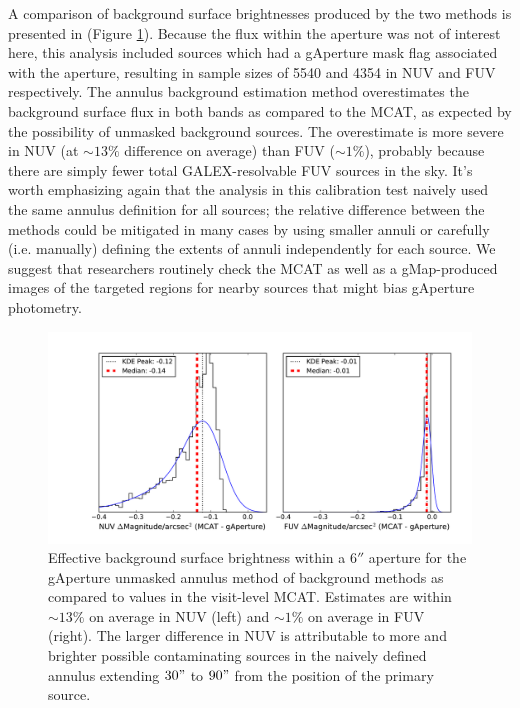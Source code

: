 \documentclass[preprint]{aastex}
\begin{document}
A comparison of background surface brightnesses produced by the two methods is presented in (Figure \ref{bgrelphot}). Because the flux within the aperture was not of interest here, this analysis included sources which had a gAperture mask flag associated with the aperture, resulting in sample sizes of 5540 and 4354 in NUV and FUV respectively. The annulus background estimation method overestimates the background surface flux in both bands as compared to the MCAT, as expected by the possibility of unmasked background sources. The overestimate is more severe in NUV (at $\sim 13\%$ difference on average) than FUV ($\sim 1\%$), probably because there are simply fewer total GALEX-resolvable FUV sources in the sky. It's worth emphasizing again that the analysis in this calibration test naively used the same annulus definition for all sources; the relative difference between the methods could be mitigated in many cases by using smaller annuli or carefully (i.e. manually) defining the extents of annuli independently for each source. We suggest that researchers routinely check the MCAT as well as a gMap-produced images of the targeted regions for nearby sources that might bias gAperture photometry.

\begin{figure}[h]
\includegraphics[scale=0.6]{Fig03.pdf}
\caption{Effective background surface brightness within a $6''$ aperture for the gAperture unmasked annulus method of background methods as compared to values in the visit-level MCAT. Estimates are within $\sim 13\%$ on average in NUV (left) and $\sim 1\%$ on average in FUV (right). The larger difference in NUV is attributable to more and brighter possible contaminating sources in the naively defined annulus extending $30"$ to $90"$ from the position of the primary source.
\label{bgrelphot}}
\end{figure}
\end{document}
